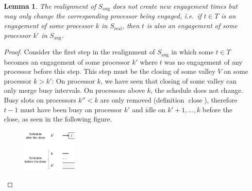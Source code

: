 \documentclass[a4paper]{article}
\DeclareMathOperator{\aug}{aug}
\DeclareMathOperator{\real}{real}
\DeclareMathOperator{\close}{close}
\newtheorem{lemma}[theorem]{Lemma}
\begin{document}
\begin{lemma}\label{lemma:engagements}
  The realignment of $S_{\aug}$ does not create new engagement times but may only change the corresponding processor being engaged, i.e.\ if $t \in T$ is an engagement of some processor $k$ in $S_{\real}$, then $t$ is also an engagement of some processor $k'$ in $S_{\aug}$.
\end{lemma}
\begin{proof}
  Consider the first step in the realignment of $S_{\aug}$ in which some $t \in T$ becomes an engagement of some processor $k'$ where $t$ was no engagement of any processor before this step.
  This step must be the closing of some valley $V$ on some processor $k > k'$:
  On processor $k$, we have seen that closing of some valley can only merge busy intervals.
  On processors above $k$, the schedule does not change.
  Busy slots on processors $k'' < k$ are only removed (definition $\close$), therefore $t-1$ must have been busy on processor $k'$ and idle on $k' + 1, \ldots, k$ before the close, as seen in the following figure.
  \begin{figure}[H]
    \centering
    \includegraphics[width=0.25\textwidth]{graphics/engagements.jpg}
  \end{figure}
  \begin{figure}[H]
    \centering
\end{figure}
\end{proof}
\end{document}
